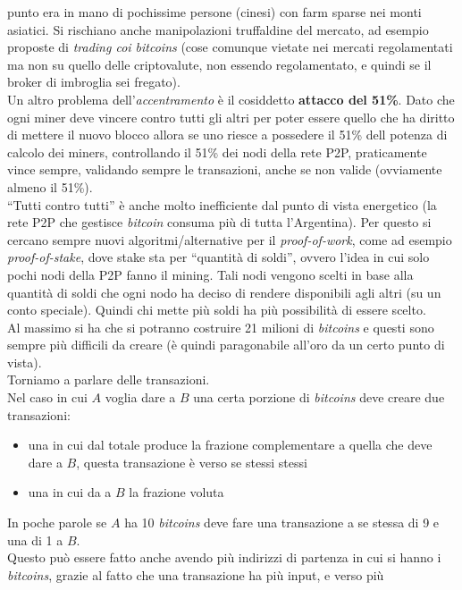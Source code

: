 \documentclass[a4paper,12pt, oneside]{book}
\begin{document}
punto era in mano di pochissime persone (cinesi) con farm sparse nei monti
asiatici. Si rischiano anche manipolazioni truffaldine del mercato, ad esempio
proposte di \textit{trading coi bitcoins} (cose comunque vietate nei mercati
regolamentati ma non su quello delle criptovalute, non essendo regolamentato, e
quindi se il broker di imbroglia sei fregato).\\
Un altro problema dell'\textit{accentramento} è il cosiddetto \textbf{attacco
  del 51\%}. Dato che ogni miner deve vincere contro tutti gli altri per poter
essere quello che ha diritto di mettere il nuovo blocco allora se uno riesce a
possedere il 51\% dell potenza di calcolo dei miners, controllando il 51\% dei
nodi della rete P2P, praticamente vince sempre, validando sempre le transazioni,
anche se non valide (ovviamente almeno il 51\%).\\
``Tutti contro tutti'' è anche molto inefficiente dal punto di vista energetico
(la rete P2P che gestisce \textit{bitcoin} consuma più di tutta l'Argentina).
Per questo si cercano sempre nuovi algoritmi/alternative per il
\textit{proof-of-work}, come ad esempio \textit{proof-of-stake}, dove stake sta
per ``quantità di soldi'', ovvero l'idea in cui solo pochi nodi della P2P fanno
il mining. Tali nodi vengono scelti in base alla quantità di soldi che ogni nodo
ha deciso di rendere disponibili agli altri (su un conto speciale). Quindi chi
mette più soldi ha più possibilità di essere scelto.\\
Al massimo si ha che si potranno costruire 21 milioni di \textit{bitcoins} e
questi sono sempre più difficili da creare (è quindi paragonabile all'oro da un
certo punto di vista).\\
Torniamo a parlare delle transazioni.\\
Nel caso in cui $A$ voglia dare a $B$ una certa porzione di \textit{bitcoins}
deve creare due transazioni:
\begin{itemize}
  \item una in cui dal totale produce la frazione complementare a quella che
  deve dare a $B$, questa transazione è verso se stessi
  stessi
  \item una in cui da a $B$ la frazione voluta
\end{itemize}
In poche parole se $A$ ha 10 \textit{bitcoins} deve fare una transazione a se
stessa di 9 e una di 1 a $B$.\\
Questo può essere fatto anche avendo più indirizzi di partenza in cui si hanno i
\textit{bitcoins}, grazie al fatto che una transazione ha più input, e verso più
\end{document}
